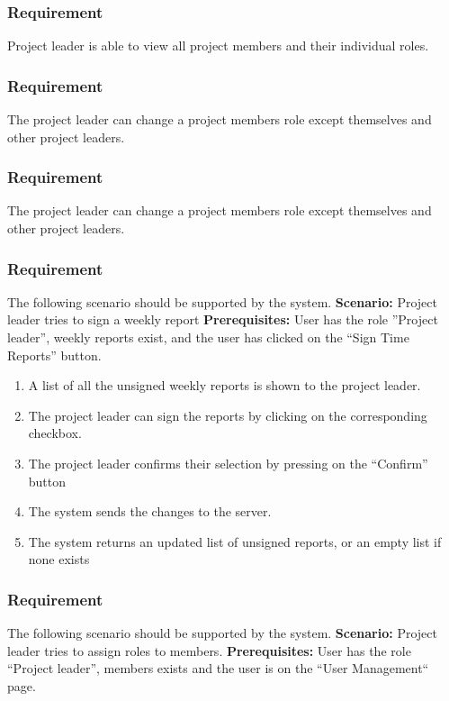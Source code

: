 \documentclass{article}
\begin{document}
\subsubsection{Requirement}
Project leader is able to view all project members and their individual roles.

\subsubsection{Requirement}
The project leader can change a project members role except themselves and other project leaders.

\subsubsection{Requirement}
The project leader can change a project members role except themselves and other project leaders.

\subsubsection{Requirement}
The following scenario should be supported by the system.
\textbf{Scenario:} Project leader tries to sign a weekly report
\textbf{Prerequisites:} User has the role ”Project leader”, weekly reports exist, and the user has clicked on the “Sign Time Reports” button.

\begin{enumerate}
    \item A list of all the unsigned weekly reports is shown to the project leader.
    \item The project leader can sign the reports by clicking on the corresponding checkbox.
    \item The project leader confirms their selection by pressing on the “Confirm” button
    \item The system sends the changes to the server.
    \item The system returns an updated list of unsigned reports, or an empty list if none exists
\end{enumerate}

\subsubsection{Requirement}
The following scenario should be supported by the system.
\textbf{Scenario:} Project leader tries to assign roles to members.
\textbf{Prerequisites:} User has the role “Project leader”, members exists and the user is on the “User Management“ page.
\end{document}
